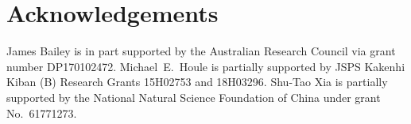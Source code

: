 \documentclass{article}
\begin{document}


\section*{Acknowledgements}
James Bailey is in part supported by the Australian Research Council via grant number DP170102472. Michael~E.~Houle is partially supported by JSPS Kakenhi Kiban (B) Research Grants 15H02753 and 18H03296. Shu-Tao Xia is partially supported by the National Natural Science Foundation of China under grant No.~61771273.



% 




\end{document}
